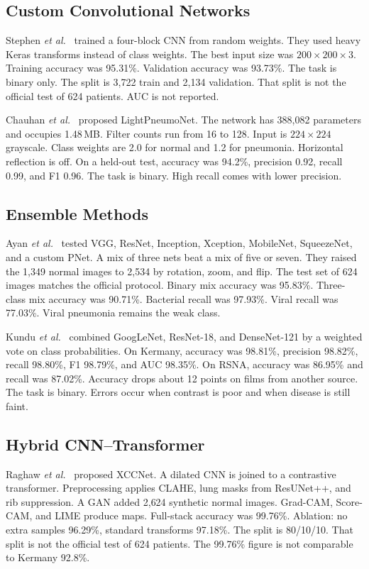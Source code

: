 \documentclass[conference]{IEEEtran}
\begin{document}
\subsection{Custom Convolutional Networks}
Stephen \textit{et al.}~\cite{stephen2019} trained a four-block CNN from random weights. They used heavy Keras transforms instead of class weights. The best input size was $200\times 200\times 3$. Training accuracy was 95.31\%. Validation accuracy was 93.73\%. The task is binary only. The split is 3{,}722 train and 2{,}134 validation. That split is not the official test of 624 patients. AUC is not reported.

Chauhan \textit{et al.}~\cite{chauhan2025} proposed LightPneumoNet. The network has 388{,}082 parameters and occupies 1.48\,MB. Filter counts run from 16 to 128. Input is $224\times 224$ grayscale. Class weights are 2.0 for normal and 1.2 for pneumonia. Horizontal reflection is off. On a held-out test, accuracy was 94.2\%, precision 0.92, recall 0.99, and F1 0.96. The task is binary. High recall comes with lower precision.

\subsection{Ensemble Methods}
Ayan \textit{et al.}~\cite{ayan2021} tested VGG, ResNet, Inception, Xception, MobileNet, SqueezeNet, and a custom PNet. A mix of three nets beat a mix of five or seven. They raised the 1{,}349 normal images to 2{,}534 by rotation, zoom, and flip. The test set of 624 images matches the official protocol. Binary mix accuracy was 95.83\%. Three-class mix accuracy was 90.71\%. Bacterial recall was 97.93\%. Viral recall was 77.03\%. Viral pneumonia remains the weak class.

Kundu \textit{et al.}~\cite{kundu2021} combined GoogLeNet, ResNet-18, and DenseNet-121 by a weighted vote on class probabilities. On Kermany, accuracy was 98.81\%, precision 98.82\%, recall 98.80\%, F1 98.79\%, and AUC 98.35\%. On RSNA, accuracy was 86.95\% and recall was 87.02\%. Accuracy drops about 12 points on films from another source. The task is binary. Errors occur when contrast is poor and when disease is still faint.

\subsection{Hybrid CNN--Transformer}
Raghaw \textit{et al.}~\cite{raghaw2024} proposed XCCNet. A dilated CNN is joined to a contrastive transformer. Preprocessing applies CLAHE, lung masks from ResUNet++, and rib suppression. A GAN added 2{,}624 synthetic normal images. Grad-CAM, Score-CAM, and LIME produce maps. Full-stack accuracy was 99.76\%. Ablation: no extra samples 96.29\%, standard transforms 97.18\%. The split is 80/10/10. That split is not the official test of 624 patients. The 99.76\% figure is not comparable to Kermany 92.8\%.
\end{document}
